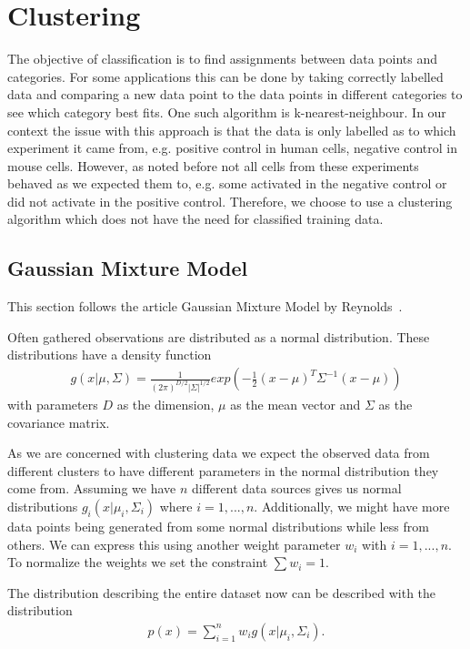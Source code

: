 \chapter{Clustering}

The objective of classification is to find assignments between data points and categories. For some applications this can be done by taking correctly labelled data and comparing a new data point to the data points in different categories to see which category best fits. One such algorithm is k-nearest-neighbour. In our context the issue with this approach is that the data is only labelled as to which experiment it came from, e.g. positive control in human cells, negative control in mouse cells. However, as noted before not all cells from these experiments behaved as we expected them to, e.g. some activated in the negative control or did not activate in the positive control. Therefore, we choose to use a clustering algorithm which does not have the need for classified training data.

\section{Gaussian Mixture Model}
\label{sec:gaussian_mixture_model}

This section follows the article Gaussian Mixture Model by Reynolds~\cite{reynolds2009}.

Often gathered observations are distributed as a normal distribution. These distributions have a density function
\begin{align*}
	g(x|\mu, \Sigma) = \frac{1}{(2\pi)^{D/2} |\Sigma|^{1/2}} exp\left( - \frac{1}{2} (x-\mu)^T \Sigma^{-1} (x-\mu) \right)
\end{align*}
with parameters $D$ as the dimension, $\mu$ as the mean vector and $\Sigma$ as the covariance matrix.

As we are concerned with clustering data we expect the observed data from different clusters to have different parameters in the normal distribution they come from. Assuming we have $n$ different data sources gives us normal distributions $g_i(x|\mu_i, \Sigma_i)$ where $i=1, ..., n$. Additionally, we might have more data points being generated from some normal distributions while less from others. We can express this using another weight parameter $w_i$ with $i=1, ..., n$. To normalize the weights we set the constraint $\sum w_i = 1$.

The distribution describing the entire dataset now can be described with the distribution
\begin{align}
	\label{eq:sum_of_normal}
	p(x) = \sum_{i=1}^{n} w_i g(x|\mu_i, \Sigma_i).
\end{align}

